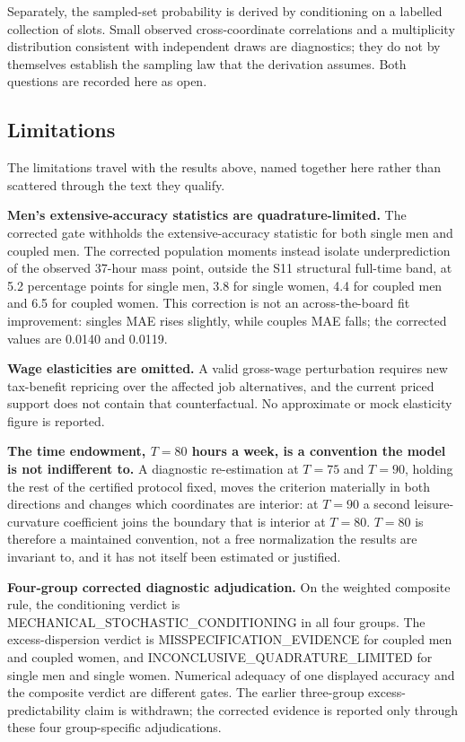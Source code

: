 \documentclass[11pt,a4paper]{article}
\begin{document}
Separately, the sampled-set probability is derived by conditioning on a labelled collection of slots. Small observed cross-coordinate correlations and a multiplicity distribution consistent with independent draws are diagnostics; they do not by themselves establish the sampling law that the derivation assumes. Both questions are recorded here as open.

\subsection{Limitations}\label{limitations}

The limitations travel with the results above, named together here rather than scattered through the text they qualify.

\textbf{Men's extensive-accuracy statistics are quadrature-limited.} The corrected gate withholds the extensive-accuracy statistic for both single men and coupled men. The corrected population moments instead isolate underprediction of the observed 37-hour mass point, outside the S11 structural full-time band, at 5.2 percentage points for single men, 3.8 for single women, 4.4 for coupled men and 6.5 for coupled women. This correction is not an across-the-board fit improvement: singles MAE rises slightly, while couples MAE falls; the corrected values are 0.0140 and 0.0119.

\textbf{Wage elasticities are omitted.} A valid gross-wage perturbation requires new tax-benefit repricing over the affected job alternatives, and the current priced support does not contain that counterfactual. No approximate or mock elasticity figure is reported.

\textbf{The time endowment, \(T=80\) hours a week, is a convention the model is not indifferent to.} A diagnostic re-estimation at \(T=75\) and \(T=90\), holding the rest of the certified protocol fixed, moves the criterion materially in both directions and changes which coordinates are interior: at \(T=90\) a second leisure-curvature coefficient joins the boundary that is interior at \(T=80\). \(T=80\) is therefore a maintained convention, not a free normalization the results are invariant to, and it has not itself been estimated or justified.

\textbf{Four-group corrected diagnostic adjudication.} On the weighted composite rule, the conditioning verdict is MECHANICAL\_STOCHASTIC\_CONDITIONING in all four groups. The excess-dispersion verdict is MISSPECIFICATION\_EVIDENCE for coupled men and coupled women, and INCONCLUSIVE\_QUADRATURE\_LIMITED for single men and single women. Numerical adequacy of one displayed accuracy and the composite verdict are different gates. The earlier three-group excess-predictability claim is withdrawn; the corrected evidence is reported only through these four group-specific adjudications.
\end{document}
